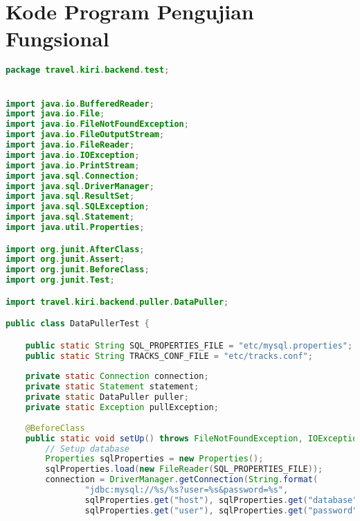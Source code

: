 \chapter{Kode Program Pengujian Fungsional}

\singlespacing 
%
%
\begin{lstlisting}[language=Java,basicstyle=\tiny,caption=DataPullerTest.java]
package travel.kiri.backend.test;


import java.io.BufferedReader;
import java.io.File;
import java.io.FileNotFoundException;
import java.io.FileOutputStream;
import java.io.FileReader;
import java.io.IOException;
import java.io.PrintStream;
import java.sql.Connection;
import java.sql.DriverManager;
import java.sql.ResultSet;
import java.sql.SQLException;
import java.sql.Statement;
import java.util.Properties;

import org.junit.AfterClass;
import org.junit.Assert;
import org.junit.BeforeClass;
import org.junit.Test;

import travel.kiri.backend.puller.DataPuller;

public class DataPullerTest {

    public static String SQL_PROPERTIES_FILE = "etc/mysql.properties";
    public static String TRACKS_CONF_FILE = "etc/tracks.conf";
    
    private static Connection connection;
    private static Statement statement;
    private static DataPuller puller;
    private static Exception pullException;
    
    @BeforeClass
    public static void setUp() throws FileNotFoundException, IOException, SQLException {
        // Setup database
        Properties sqlProperties = new Properties();
        sqlProperties.load(new FileReader(SQL_PROPERTIES_FILE));
        connection = DriverManager.getConnection(String.format(
                "jdbc:mysql://%s/%s?user=%s&password=%s",
                sqlProperties.get("host"), sqlProperties.get("database"),
                sqlProperties.get("user"), sqlProperties.get("password")));
        

\end{lstlisting}
